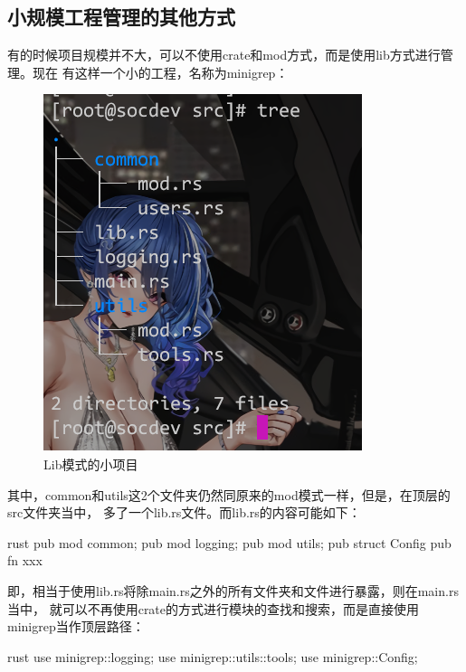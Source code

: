 \subsection{小规模工程管理的其他方式}
有的时候项目规模并不大，可以不使用crate和mod方式，而是使用lib方式进行管理。现在
有这样一个小的工程，名称为minigrep：
\begin{figure}[H]
  \centering
  \includegraphics[width=\linewidth]{rust_lib_mod.png}
  \caption{Lib模式的小项目}
  \label{fig:rust_lib_mod}
\end{figure}
其中，common和utils这2个文件夹仍然同原来的mod模式一样，但是，在顶层的src文件夹当中，
多了一个lib.rs文件。而lib.rs的内容可能如下：
\begin{code-block}{rust}
pub mod common;
pub mod logging;
pub mod utils;
pub struct Config { }
pub fn xxx { }
\end{code-block}
即，相当于使用lib.rs将除main.rs之外的所有文件夹和文件进行暴露，则在main.rs当中，
就可以不再使用crate的方式进行模块的查找和搜索，而是直接使用minigrep当作顶层路径：
\begin{code-block}{rust}
use minigrep::logging;
use minigrep::utils::tools;
use minigrep::Config;
\end{code-block}

